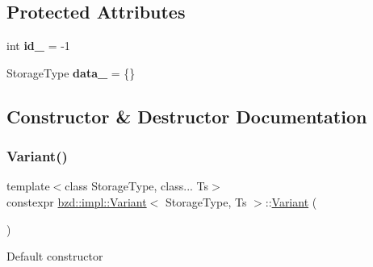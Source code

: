 \subsection*{Protected Attributes}
\begin{DoxyCompactItemize}
\item 
\mbox{\label{classbzd_1_1impl_1_1Variant_a4724248f12580869e0d80807fe68e8dd}} 
int {\bfseries id\+\_\+} = -\/1
\item 
\mbox{\label{classbzd_1_1impl_1_1Variant_abf63d95fa214179c274de6c3ca2ecd48}} 
Storage\+Type {\bfseries data\+\_\+} = \{\}
\end{DoxyCompactItemize}


\subsection{Constructor \& Destructor Documentation}
\mbox{\label{classbzd_1_1impl_1_1Variant_a94b14a37ebd4899550f5ce6630715cdf}} 
\subsubsection{\texorpdfstring{Variant()}{Variant()}\hspace{0.1cm}{\footnotesize\ttfamily [1/2]}}
{\footnotesize\ttfamily template$<$class Storage\+Type, class... Ts$>$ \\
constexpr \hyperlink{classbzd_1_1impl_1_1Variant}{bzd\+::impl\+::\+Variant}$<$ Storage\+Type, Ts $>$\+::\hyperlink{classbzd_1_1impl_1_1Variant}{Variant} (\begin{DoxyParamCaption}{ }\end{DoxyParamCaption})\hspace{0.3cm}{\ttfamily [default]}}

Default constructor \mbox{\label{classbzd_1_1impl_1_1Variant_a814875f9a6cfc7e22972466999a88d2f}} 
